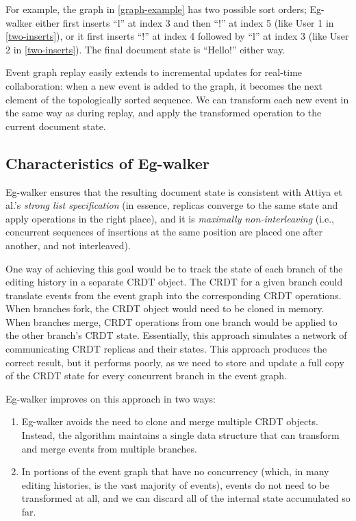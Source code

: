 \documentclass[sigplan,10pt]{acmart}
\newcommand{\algname}{Eg-walker\xspace}
\begin{document}
For example, the graph in \autoref{graph-example} has two possible sort orders; \algname either first inserts ``l'' at index 3 and then ``!'' at index 5 (like User 1 in \autoref{two-inserts}), or it first inserts ``!'' at index 4 followed by ``l'' at index 3 (like User 2 in \autoref{two-inserts}). The final document state is ``Hello!'' either way.

Event graph replay easily extends to incremental updates for real-time collaboration: when a new event is added to the graph, it becomes the next element of the topologically sorted sequence.
We can transform each new event in the same way as during replay, and apply the transformed operation to the current document state.

\subsection{Characteristics of \algname}\label{characteristics}

\algname ensures that the resulting document state is consistent with Attiya et al.'s \emph{strong list specification} \cite{Attiya2016} (in essence, replicas converge to the same state and apply operations in the right place), and it is \emph{maximally non-interleaving} \cite{fugue} (i.e., concurrent sequences of insertions at the same position are placed one after another, and not interleaved).

One way of achieving this goal would be to track the state of each branch of the editing history in a separate CRDT object.
The CRDT for a given branch could translate events from the event graph into the corresponding CRDT operations.
When branches fork, the CRDT object would need to be cloned in memory.
When branches merge, CRDT operations from one branch would be applied to the other branch's CRDT state.
Essentially, this approach simulates a network of communicating CRDT replicas and their states.
This approach produces the correct result, but it performs poorly, as we need to store and update a full copy of the CRDT state for every concurrent branch in the event graph.


\algname improves on this approach in two ways:

\begin{enumerate}
\item \algname avoids the need to clone and merge multiple CRDT objects. Instead, the algorithm maintains a single data structure that can transform and merge events from multiple branches.
\item In portions of the event graph that have no concurrency (which, in many editing histories, is the vast majority of events), events do not need to be transformed at all, and we can discard all of the internal state accumulated so far.
\end{enumerate}
\end{document}
